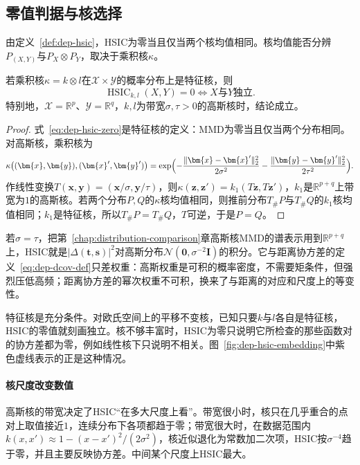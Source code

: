 \subsection{零值判据与核选择}
\label{sec:dep-hsic-zero}

由定义~\ref{def:dep-hsic}，HSIC为零当且仅当两个核均值相同。核均值能否分辨$P_{(X,Y)}$与$P_X\otimes P_Y$，取决于乘积核$\kappa$。

\begin{theorem}[HSIC的零值判据]
\label{thm:dep-hsic-zero}
若乘积核$\kappa=k\otimes l$在$\mathcal{X}\times\mathcal{Y}$的概率分布上是特征核，则
\begin{equation}
  \operatorname{HSIC}_{k,l}(X,Y)=0\iff X\text{与}Y\text{独立}.
  \label{eq:dep-hsic-zero}
\end{equation}
特别地，$\mathcal{X}=\mathbb{R}^{p}$、$\mathcal{Y}=\mathbb{R}^{q}$，$k,l$为带宽$\sigma,\tau>0$的高斯核时，结论成立。
\end{theorem}

\begin{proof}
式~\eqref{eq:dep-hsic-zero}是特征核的定义：MMD为零当且仅当两个分布相同。对高斯核，乘积核为
\[
  \kappa\bigl((\bm{x},\bm{y}),(\bm{x}',\bm{y}')\bigr)=\exp\Bigl(-\frac{\lVert\bm{x}-\bm{x}'\rVert_2^{2}}{2\sigma^{2}}-\frac{\lVert\bm{y}-\bm{y}'\rVert_2^{2}}{2\tau^{2}}\Bigr).
\]
作线性变换$T(\bm{x},\bm{y})=(\bm{x}/\sigma,\bm{y}/\tau)$，则$\kappa(\bm{z},\bm{z}')=k_1(T\bm{z},T\bm{z}')$，$k_1$是$\mathbb{R}^{p+q}$上带宽为$1$的高斯核。若两个分布$P,Q$的$\kappa$核均值相同，则推前分布$T_{\#}P$与$T_{\#}Q$的$k_1$核均值相同；$k_1$是特征核，所以$T_{\#}P=T_{\#}Q$，$T$可逆，于是$P=Q$。
\end{proof}

若$\sigma=\tau$，把第~\ref{chap:distribution-comparison}章高斯核MMD的谱表示用到$\mathbb{R}^{p+q}$上，HSIC就是$\lvert\Delta(\bm{t},\bm{s})\rvert^{2}$对高斯分布$\mathcal{N}(\bm{0},\sigma^{-2}\bm{I})$的积分。它与距离协方差的定义~\eqref{eq:dep-dcov-def}只差权重：高斯权重是可积的概率密度，不需要矩条件，但强烈压低高频；距离协方差的幂次权重不可积，换来了与距离的对应和尺度上的等变性。

特征核是充分条件。对欧氏空间上的平移不变核，已知只要$k$与$l$各自是特征核，HSIC的零值就刻画独立。核不够丰富时，HSIC为零只说明它所检查的那些函数对的协方差都为零，例如线性核下只说明不相关。图~\ref{fig:dep-hsic-embedding}中紫色虚线表示的正是这种情况。

\paragraph{核尺度改变数值}
高斯核的带宽决定了HSIC“在多大尺度上看”。带宽很小时，核只在几乎重合的点对上取值接近$1$，连续分布下各项都趋于零；带宽很大时，在数据范围内$k(x,x')\approx1-(x-x')^{2}/(2\sigma^{2})$，核近似退化为常数加二次项，HSIC按$\sigma^{-4}$趋于零，并且主要反映协方差。中间某个尺度上HSIC最大。


